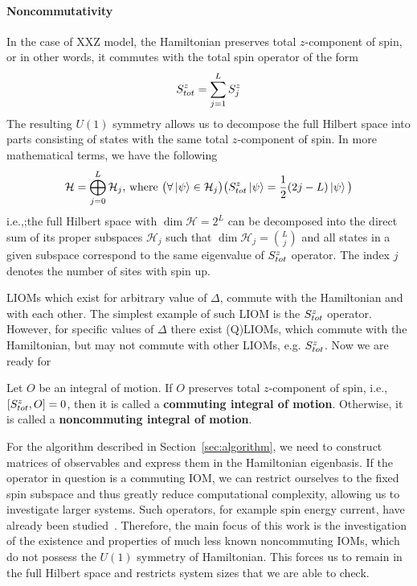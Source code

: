 \paragraph{Noncommutativity}In the case of XXZ model, the Hamiltonian preserves total \(z\)-component of spin,
or in other words, it commutes with the total spin operator of the form
\begin{equation}
  S^{z}_{tot} = \sum_{j = 1}^{L} S^{z}_j
  \label{eq:magnetization}
\end{equation}
The resulting \(U(1)\) symmetry allows us to decompose the full Hilbert space into parts consisting of states with the same total \(z\)-component
of spin. In more mathematical terms, we have the following
\begin{equation*}
  \mathcal{H} = \bigoplus_{j = 0}^{L} \mathcal{H}_j \text{, where } \big(\forall \ket{\psi} \in \mathcal{H}_j \big) \big(S^{z}_{tot} \ket{\psi} = \frac{1}{2}(2j-L) \ket{\psi} \big)
\end{equation*}
i.e.,;the full Hilbert space with \(\dim{\mathcal{H}} = 2^L\) can be decomposed into the direct sum of its proper subspaces
\(\mathcal{H}_j\) such that \(\dim{\mathcal{H}_j} = \binom{L}{j}\) and all states in a given subspace correspond to the same
eigenvalue of \(S^{z}_{tot}\) operator. The index \(j\) denotes the number of sites with spin up.

LIOMs which exist for arbitrary value of \( \Delta\),
commute with the Hamiltonian and with each other. The simplest example 
of such LIOM is the \(S^{z}_{tot}\) operator. However, for specific values of \(\Delta \) there exist
(Q)LIOMs, which commute with the Hamiltonian, but may not commute with other LIOMs, e.g. \(S^{z}_{tot}\).
Now we are ready for
\begin{definition}
  Let \(O\) be an integral of motion. If \(O\) preserves total \(z\)-component of spin, i.e.,
  \(\comm{\Sz_{tot}}{O} = 0\), then it is called a \textbf{commuting integral of motion}.
  Otherwise, it is called a \textbf{noncommuting integral of motion}.\label{def:noncomm def}
\end{definition}
For the algorithm described in Section~\ref{sec:algorithm}, we need to construct matrices of
observables and express them in the Hamiltonian eigenbasis. If the operator in question is a
commuting IOM, we can restrict ourselves to the fixed spin subspace and thus greatly reduce
computational complexity, allowing us to investigate larger systems. Such operators, for example
spin energy current, have already been studied~\autocite{Mierzejewski2015Approx}. Therefore,
the main focus of this work is the investigation of the existence and properties of much less known
noncommuting IOMs, which do not possess the \(U(1)\) symmetry of Hamiltonian. 
This forces us to remain in the full Hilbert space and restricts system sizes that we are able to check.

